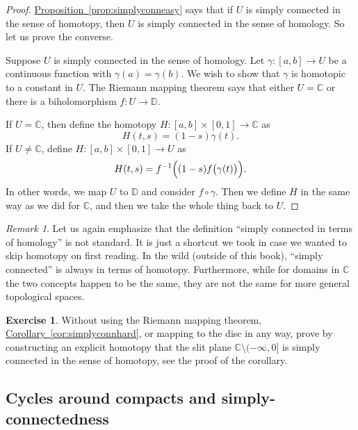 \documentclass[12pt,openany]{book}
\newcommand{\C}{{\mathbb{C}}}
\newcommand{\D}{{\mathbb{D}}}
\newcommand{\myquote}[1]{``#1''}
\theoremstyle{plain}
\theoremstyle{remark}
\newtheorem{remark}[thm]{Remark}
\theoremstyle{definition}
\newenvironment{exbox}{%
    \def\FrameCommand{\vrule width 1pt \relax\hspace{10pt}}%
    \MakeFramed{\advance\hsize-\width\FrameRestore}%
}{%
    \endMakeFramed
}
\theoremstyle{exercise}
\newtheorem{exercise}{Exercise}[section]
\theoremstyle{example}
\newcommand{\propref}[1]{\hyperref[#1]{Proposition~\ref*{#1}}}
\newcommand{\corref}[1]{\hyperref[#1]{Corollary~\ref*{#1}}}
\begin{document}
\begin{proof}
\propref{prop:simplyconneasy} says that if $U$ is
simply connected in the sense of homotopy, then $U$ is simply connected
in the sense of homology.  So let us prove the converse.

Suppose $U$ is simply connected in
the sense of homology.
Let $\gamma \colon [a,b] \to U$ be a continuous function with
$\gamma(a)=\gamma(b)$.  We wish to show that $\gamma$ is homotopic to a
constant in $U$.
The Riemann mapping theorem says that either $U =
\C$ or there is a biholomorphism $f \colon U \to \D$.

If $U = \C$, then define the homotopy $H \colon [a,b] \times [0,1] \to
\C$ as
\begin{equation*}
H(t,s) = (1-s) \gamma(t) .
\end{equation*}
If $U \not= \C$, define $H \colon [a,b] \times [0,1] \to U$ as
\begin{equation*}
H(t,s) = f^{-1} \Bigl( (1-s) f \bigl( \gamma(t) \bigr) \Bigr) .
\end{equation*}
In other words, we map $U$ to $\D$ and consider $f \circ \gamma$.
Then we define $H$ in the same way as we did for $\C$, and then we
take the whole thing back to $U$.
\end{proof}

\begin{remark}
Let us again emphasize that the definition
\myquote{simply connected in terms of homology} is not standard.
It is just a shortcut we took in case we wanted
to skip homotopy on first reading.  In the wild (outside of this book),
\myquote{simply connected} is
always in terms of homotopy.  Furthermore, while for domains in $\C$ the two
concepts happen to be the same, they are not the same for more
general topological spaces.
\end{remark}

\begin{exbox}
\begin{exercise}
Without using the Riemann mapping theorem, \corref{cor:simplyconnhard},
or mapping to the disc in any way, prove by constructing an explicit homotopy
that the slit plane $\C \setminus (-\infty,0]$ is simply connected in
the sense of homotopy, see the proof of the corollary.
\end{exercise}
\end{exbox}

\subsection{Cycles around compacts and simply-connectedness}\label{subsec:patharoundK}
\end{document}
